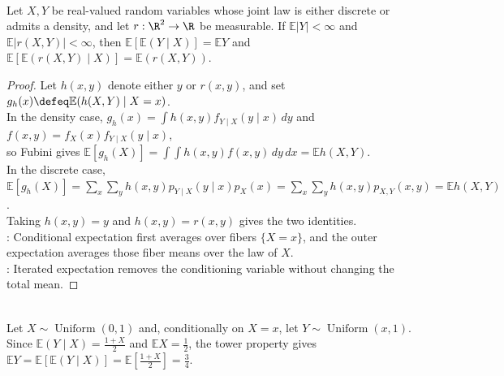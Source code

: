 \begin{theorem} \label{thm:tower-property-iterated-expectation-elementary} \\
Let $X,Y$ be real-valued random variables whose joint law is either discrete or admits a density, and let $r:\R^2\to\R$ be measurable.
If $\mathbb{E}|Y|<\infty$ and $\mathbb{E}|r(X,Y)|<\infty$, then $\mathbb{E}[\mathbb{E}(Y\mid X)]=\mathbb{E}Y$ and $\mathbb{E}[\mathbb{E}(r(X,Y)\mid X)]=\mathbb{E}(r(X,Y))$.
\begin{proof}
Let $h(x,y)$ denote either $y$ or $r(x,y)$, and set $g_h(x)\defeq\mathbb{E}(h(X,Y)\mid X=x)$.\\
In the density case, $g_h(x)=\int h(x,y)f_{Y\mid X}(y\mid x)\,dy$ and $f(x,y)=f_X(x)f_{Y\mid X}(y\mid x)$,\\
so Fubini gives $\mathbb{E}[g_h(X)]=\int\int h(x,y)f(x,y)\,dy\,dx=\mathbb{E}h(X,Y)$.\\
In the discrete case, $\mathbb{E}[g_h(X)]=\sum\limits_x\sum\limits_y h(x,y)p_{Y\mid X}(y\mid x)p_X(x)=\sum\limits_x\sum\limits_y h(x,y)p_{X,Y}(x,y)=\mathbb{E}h(X,Y)$.\\
Taking $h(x,y)=y$ and $h(x,y)=r(x,y)$ gives the two identities.\\
: Conditional expectation first averages over fibers $\{X=x\}$, and the outer expectation averages those fiber means over the law of $X$.\\
: Iterated expectation removes the conditioning variable without changing the total mean.
\end{proof}
\end{theorem}

\begin{example} \label{ex:tower-property-conditional-uniform} \\
Let $X\sim\operatorname{Uniform}(0,1)$ and, conditionally on $X=x$, let $Y\sim\operatorname{Uniform}(x,1)$.\\
Since $\mathbb{E}(Y\mid X)=\frac{1+X}{2}$ and $\mathbb{E}X=\frac{1}{2}$, the tower property gives $\mathbb{E}Y=\mathbb{E}[\mathbb{E}(Y\mid X)]=\mathbb{E}\left[\frac{1+X}{2}\right]=\frac{3}{4}$.
\end{example}

